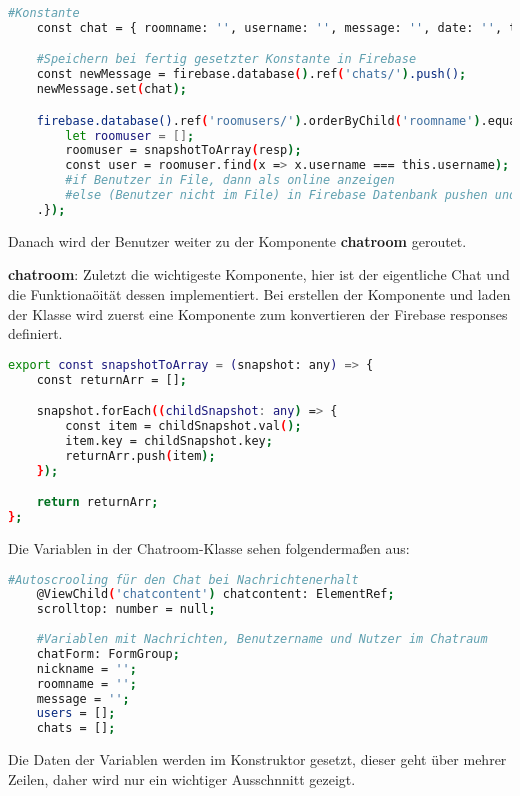 \begin{lstlisting}[language=bash]
    #Konstante
    const chat = { roomname: '', username: '', message: '', date: '', type: '' };

    #Speichern bei fertig gesetzter Konstante in Firebase
    const newMessage = firebase.database().ref('chats/').push();
    newMessage.set(chat);

    firebase.database().ref('roomusers/').orderByChild('roomname').equalTo(roomname).on('value', (resp: any) => {
        let roomuser = [];
        roomuser = snapshotToArray(resp);
        const user = roomuser.find(x => x.username === this.username);
        #if Benutzer in File, dann als online anzeigen
        #else (Benutzer nicht im File) in Firebase Datenbank pushen und als online anzeigen
    .});
\end{lstlisting}

Danach wird der Benutzer weiter zu der Komponente \textbf{chatroom} geroutet.

\textbf{chatroom}: Zuletzt die wichtigeste Komponente, hier ist der eigentliche Chat und die Funktionaöität dessen implementiert. Bei erstellen der Komponente und laden der Klasse wird zuerst eine Komponente zum konvertieren
der Firebase responses definiert.

\begin{lstlisting}[language=bash]
    export const snapshotToArray = (snapshot: any) => {
    const returnArr = [];

    snapshot.forEach((childSnapshot: any) => {
        const item = childSnapshot.val();
        item.key = childSnapshot.key;
        returnArr.push(item);
    });

    return returnArr;
};
\end{lstlisting}

Die Variablen in der Chatroom-Klasse sehen folgendermaßen aus:

\begin{lstlisting}[language=bash]
    #Autoscrooling für den Chat bei Nachrichtenerhalt
    @ViewChild('chatcontent') chatcontent: ElementRef;
    scrolltop: number = null;
  
    #Variablen mit Nachrichten, Benutzername und Nutzer im Chatraum
    chatForm: FormGroup;
    nickname = '';
    roomname = '';
    message = '';
    users = [];
    chats = [];
\end{lstlisting}

Die Daten der Variablen werden im Konstruktor gesetzt, dieser geht über mehrer Zeilen, daher wird nur ein wichtiger Ausschnnitt gezeigt.

